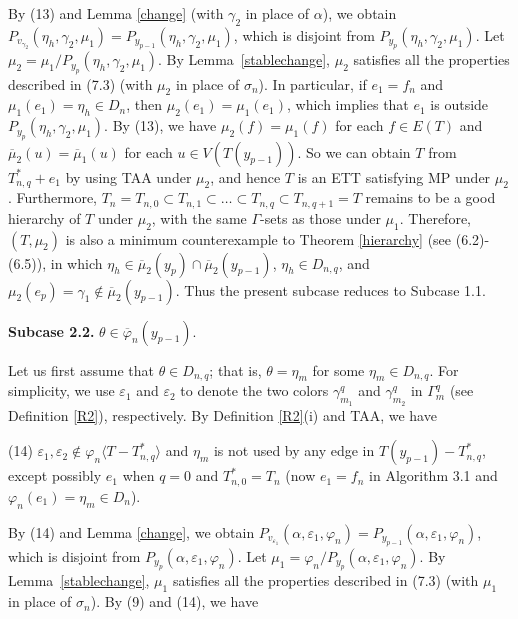 \documentclass[11pt]{article}
\begin{document}
By (13) and Lemma \ref{change} (with $\gamma_2$ in place of $\alpha$), we obtain $P_{v_{\gamma_2}}(\eta_h,\gamma_{2},\mu_1)=P_{y_{p-1}}(\eta_h,\gamma_{2},
\mu_1)$, which is disjoint from $P_{y_{p}}(\eta_h,\gamma_{2},\mu_1)$.  Let $\mu_2=\mu_1/P_{y_{p}}(\eta_h,\gamma_{2},
\mu_1)$. By Lemma~\ref{stablechange},  $\mu_2$ satisfies all the properties described in (7.3) (with $\mu_2$ in place of
$\sigma_n$).  In particular, if $e_1=f_n$ and $\mu_1(e_1)=\eta_h \in D_n$, then $\mu_2(e_1)=\mu_1(e_1)$, which 
implies that $e_1$ is outside $P_{y_{p}}(\eta_h,\gamma_{2},\mu_1)$. By (13), we have $\mu_2(f)=\mu_1(f)$ for each 
$f\in E(T)$ and $\overline{\mu}_2(u)= \overline{\mu}_1(u)$ for each $u\in V(T(y_{p-1}))$. So we can obtain $T$ from
$T_{n,q}^*+e_1$ by using TAA under $\mu_2$, and hence $T$ is an ETT satisfying MP under $\mu_2$. Furthermore,
$T_n=T_{n,0} \subset T_{n,1} \subset \ldots \subset T_{n,q} \subset T_{n,q+1}=T$ 
remains to be a good hierarchy of $T$ under $\mu_2$, with the same $\Gamma$-sets as those under $\mu_1$. 
Therefore, $(T, \mu_2)$ is also a minimum counterexample to Theorem \ref{hierarchy} (see (6.2)-(6.5)), in which $\eta_h \in\overline{\mu}_2(y_p)\cap\overline{\mu}_2(y_{p-1})$,  $\eta_h\in D_{n,q}$, and $\mu_2(e_p)=\gamma_1 \notin \overline{\mu}_2(y_{p-1})$. Thus the present subcase reduces to Subcase 1.1.

{\bf Subcase 2.2.} $\theta\in\overline{\varphi}_n(y_{p-1})$. 

Let us first assume that $\theta \in D_{n,q}$; that is, $\theta=\eta_{m}$ for some $\eta_m\in D_{n,q}$. For 
simplicity, we use $\varepsilon_1$ and $\varepsilon_2$ to denote the two colors $\gamma^{q}_{m_1}$ and 
$\gamma^{q}_{m_2}$ in $\Gamma^{q}_m$ (see Definition \ref{R2}), respectively. By Definition \ref{R2}(i) and TAA, we have

(14) $\varepsilon_1, \varepsilon_2 \notin \varphi_n \langle T-T_{n,q}^* \rangle$ and $\eta_m$ is not used by 
any edge in $T(y_{p-1}) -  T_{n,q}^*$, except possibly $e_1$ when $q=0$ and $T_{n,0}^*=T_n$ (now $e_1=f_n$ in 
Algorithm 3.1 and $\varphi_n(e_1)=\eta_m \in D_n$). 

By (14) and Lemma \ref{change}, we obtain $P_{v_{\varepsilon_1}}(\alpha, \varepsilon_1, \varphi_n)
=P_{y_{p-1}}(\alpha, \varepsilon_1, \varphi_n)$, which is disjoint from $P_{y_{p}}(\alpha, \varepsilon_1, \varphi_n)$.
Let $\mu_1=\varphi_n/P_{y_{p}}(\alpha, \varepsilon_1, \varphi_n)$. By Lemma~\ref{stablechange}, $\mu_1$ satisfies all 
the properties described in (7.3) (with $\mu_1$ in place of $\sigma_n$).  By (9) and (14), we have 
\end{document}
